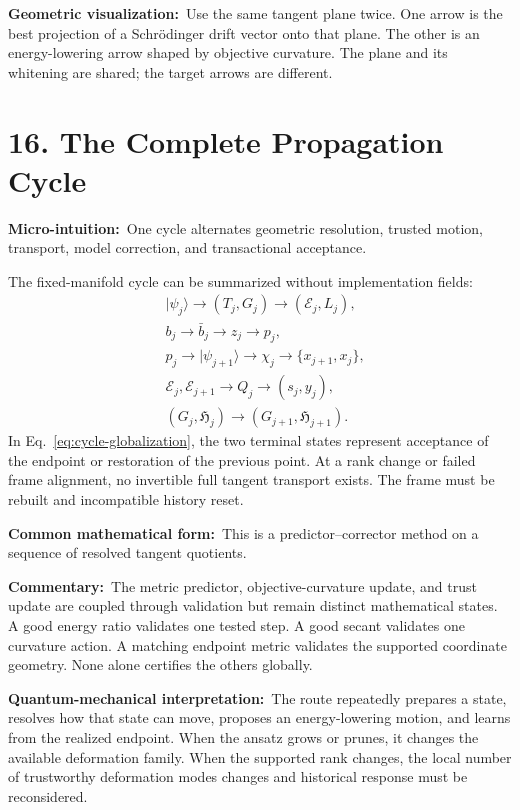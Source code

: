 \documentclass[10pt,twocolumn]{article}
\newcommand{\ket}[1]{|#1\rangle}
\newcommand{\micro}[1]{\par\noindent\textbf{Micro-intuition:}\ #1\par}
\newcommand{\form}[1]{\par\noindent\textbf{Common mathematical form:}\ #1\par}
\newcommand{\commentary}[1]{\par\noindent\textbf{Commentary:}\ #1\par}
\newcommand{\phys}[1]{\par\noindent\textbf{Quantum-mechanical interpretation:}\ #1\par}
\newcommand{\geom}[1]{\par\noindent\textbf{Geometric visualization:}\ \textcolor{teal!70!black}{#1}\par}
\newcommand{\conceptbreak}{\par\medskip\noindent{\color{black!30}\rule{\columnwidth}{0.35pt}}\par\medskip}
\begin{document}
\geom{Use the same tangent plane twice. One arrow is the best projection of a
Schr\"odinger drift vector onto that plane. The other is an energy-lowering
arrow shaped by objective curvature. The plane and its whitening are shared;
the target arrows are different.}

\conceptbreak

\section*{16. The Complete Propagation Cycle}

\micro{One cycle alternates geometric resolution, trusted motion, transport,
model correction, and transactional acceptance.}

The fixed-manifold cycle can be summarized without implementation fields:
\begin{align}
&\ket{\psi_j}
\longrightarrow(T_j,G_j)
\longrightarrow(\mathcal E_j,L_j),
\label{eq:cycle-geometry}\\
&b_j
\longrightarrow\bar b_j
\longrightarrow z_j
\longrightarrow p_j,
\label{eq:cycle-step}\\
&p_j
\longrightarrow\ket{\psi_{j+1}}
\longrightarrow\chi_j
\longrightarrow\{x_{j+1},x_j\},
\label{eq:cycle-globalization}\\
&\mathcal E_j,\mathcal E_{j+1}
\longrightarrow Q_j
\longrightarrow(s_j,y_j),
\label{eq:cycle-transport}\\
&(G_j,\mathfrak H_j)
\longrightarrow
(G_{j+1},\mathfrak H_{j+1}).
\label{eq:cycle-update}
\end{align}
In Eq.~\eqref{eq:cycle-globalization}, the two terminal states represent
acceptance of the endpoint or restoration of the previous point. At a rank
change or failed frame alignment, no invertible full tangent transport exists.
The frame must be rebuilt and incompatible history reset.

\form{This is a predictor--corrector method on a sequence of resolved tangent
quotients.}

\commentary{The metric predictor, objective-curvature update, and trust update
are coupled through validation but remain distinct mathematical states. A good
energy ratio validates one tested step. A good secant validates one curvature
action. A matching endpoint metric validates the supported coordinate geometry.
None alone certifies the others globally.}

\phys{The route repeatedly prepares a state, resolves how that state can move,
proposes an energy-lowering motion, and learns from the realized endpoint. When
the ansatz grows or prunes, it changes the available deformation family. When
the supported rank changes, the local number of trustworthy deformation modes
changes and historical response must be reconsidered.}
\end{document}
